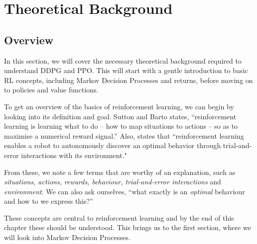 \chapter{Theoretical Background}
\label{chap:background_RL}

\section{Overview}

In this section, we will cover the necessary theoretical background required to understand DDPG and PPO. This will start with a gentle introduction to basic RL concepts, including Markov Decision Processes and returns, before moving on to policies and value functions. 

To get an overview of the basics of reinforcement learning, we can begin by looking into its definition and goal. Sutton and Barto \cite{suttonAndBartoBook} states, ``reinforcement learning is learning what to do -- how to map situations to actions -- so as to maximise a numerical reward signal.''
Also, \cite{RLinRoboticsSurvey} states that ``reinforcement learning enables a robot to autonomously discover an optimal behavior through trial-and-error interactions with its environment."

From these, we note a few terms that are worthy of an explanation, such as \textit{situations, actions, rewards, behaviour, trial-and-error interactions} and \textit{environment}.
We can also ask ourselves, ``what exactly is an \textit{optimal} behaviour and how to we express this?''

These concepts are central to reinforcement learning and by the end of this chapter these should be understood. This brings us to the first section, where we will look into Markov Decision Processes.

